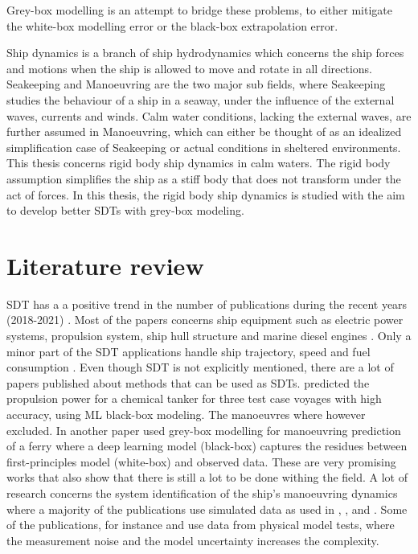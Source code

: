 Grey-box modelling is an attempt to bridge these problems, to either mitigate the white-box modelling error or the black-box extrapolation error.

Ship dynamics is a branch of ship hydrodynamics which concerns the ship forces and motions when the ship is allowed to move and rotate in all directions. Seakeeping and Manoeuvring are the two major sub fields, where Seakeeping studies the  behaviour of a ship in a seaway, under the influence of the external waves, currents and winds. Calm water conditions, lacking the external waves, are further assumed in Manoeuvring, which can either be thought of as an idealized simplification case of Seakeeping or actual conditions in sheltered environments. This thesis concerns rigid body ship dynamics in calm waters. The rigid body assumption simplifies the ship as a stiff body that does not transform under the act of forces. In this thesis, the rigid body ship dynamics is studied with the aim to develop better SDTs with grey-box modeling.

\section{Literature review}
SDT has a a positive trend in the number of publications during the recent years (2018-2021)  \cite{assani_ships_2022}. Most of the papers concerns ship equipment such as electric power systems, propulsion system, ship hull structure and marine diesel engines \cite{assani_ships_2022}. Only a minor part of the SDT applications handle ship trajectory, speed and fuel consumption \cite{assani_ships_2022}.   
Even though SDT is not explicitly mentioned, there are a lot of papers published about methods that can be used as SDTs. \cite{lang_comparison_2022} predicted the propulsion power for a chemical tanker for three test case voyages with high accuracy, using ML black-box modeling. The manoeuvres where however excluded. In another paper \cite{nielsen_machine_2022} used grey-box modelling for manoeuvring prediction of a ferry where a deep learning model (black-box) captures the residues between first-principles model (white-box) and observed data. These are very promising works that also show that there is still a lot to be done withing the field. 
A lot of research concerns the system identification of the ship's manoeuvring dynamics where a majority of the publications use simulated data as used in 
\cite{shi_identification_2009}, \cite{perera_system_2015}, \cite{zhu_parameter_2017} and \cite{wang_parameter_2021}. Some of the publications, for instance \cite{luo_parameter_2016} and \cite{he_nonparametric_2022} use data from physical model tests, where the measurement noise and the model uncertainty increases the complexity. 


